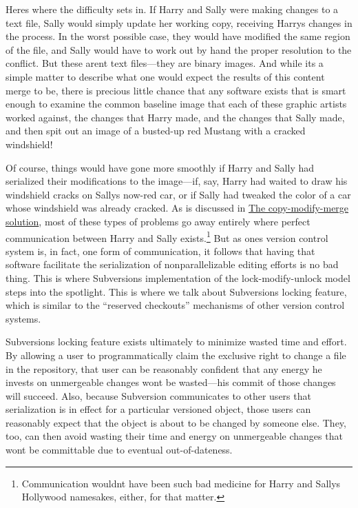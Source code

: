 Here\textquotesingle s where the difficulty sets in. If Harry and Sally
were making changes to a text file, Sally would simply update her
working copy, receiving Harry\textquotesingle s changes in the process.
In the worst possible case, they would have modified the same region of
the file, and Sally would have to work out by hand the proper resolution
to the conflict. But these aren\textquotesingle t text files---they are
binary images. And while it\textquotesingle s a simple matter to
describe what one would expect the results of this content merge to be,
there is precious little chance that any software exists that is smart
enough to examine the common baseline image that each of these graphic
artists worked against, the changes that Harry made, and the changes
that Sally made, and then spit out an image of a busted-up red Mustang
with a cracked windshield!

Of course, things would have gone more smoothly if Harry and Sally had
serialized their modifications to the image---if, say, Harry had waited
to draw his windshield cracks on Sally\textquotesingle s now-red car, or
if Sally had tweaked the color of a car whose windshield was already
cracked. As is discussed in
\hyperref[svn.basic.vsn-models.copy-merge]{The copy-modify-merge
solution}, most of these types of problems go away entirely where
perfect communication between Harry and Sally exists.\footnote{Communication
  wouldn\textquotesingle t have been such bad medicine for Harry and
  Sally\textquotesingle s Hollywood namesakes, either, for that matter.}
But as one\textquotesingle s version control system is, in fact, one
form of communication, it follows that having that software facilitate
the serialization of nonparallelizable editing efforts is no bad thing.
This is where Subversion\textquotesingle s implementation of the
lock-modify-unlock model steps into the spotlight. This is where we talk
about Subversion\textquotesingle s locking feature, which is similar to
the ``reserved checkouts'' mechanisms of other version control systems.

Subversion\textquotesingle s locking feature exists ultimately to
minimize wasted time and effort. By allowing a user to programmatically
claim the exclusive right to change a file in the repository, that user
can be reasonably confident that any energy he invests on unmergeable
changes won\textquotesingle t be wasted---his commit of those changes
will succeed. Also, because Subversion communicates to other users that
serialization is in effect for a particular versioned object, those
users can reasonably expect that the object is about to be changed by
someone else. They, too, can then avoid wasting their time and energy on
unmergeable changes that won\textquotesingle t be committable due to
eventual out-of-dateness.

